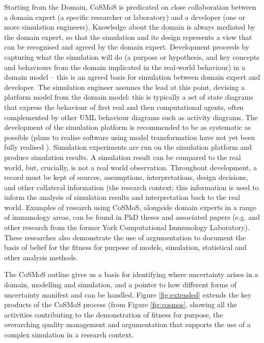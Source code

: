\documentclass[sigconf,authordraft]{acmart}
\begin{document}
Starting from the Domain, CoSMoS is predicated on close collaboration between a domain expert (a specific researcher or laboratory) and a developer (one or more simulation engineers).  Knowledge about the domain is always mediated by the domain expert, so that the simulation and its design represents a view that can be recognised and agreed by the domain expert.  Development proceeds by capturing what the simulation will do (a purpose or hypothesis, and key concepts and behaviours from the domain implicated in the real-world behaviour) in a domain model -- this is an agreed basis for simulation between domain expert and developer.  The simulation engineer assumes the lead at this point, devising a platform model from the domain model: this is typically a set of state diagrams that express the behaviour of first real and then computational agents, often complemented by other UML behaviour diagrams such as activity diagrams.  The development of the simulation platform is recommended to be as systematic as possible (plans to realise software using model transformation have not yet been fully realised \cite{workshop}).  Simulation experiments are run on the simulation platform and produce simulation results.  A simulation result can be compared to the real world, but, crucially, is not a real world observation.  Throughout development, a record must be kept of sources, assumptions, interpretations, design decisions, and other collateral information (the research context; this information is used to inform the analysis of simulation results and interpretation back to the real world.  Examples of research using CoSMoS, alongside domain experts in a range of immunology areas, can be found in PhD theses and associated papers (e.g. \cite{aldenPhD,moyoPhD,readPhD,williamsEAE} and other research from the former York Computational Immunology Laboratory).  These researches also demonstrate the use of argumentation \cite{AldenArg,cosmosBook} to document the basis of belief for the fitness for purpose of models, simulation, statistical and other analysis methods.

The CoSMoS outline gives us a basis for identifying where uncertainty arises in a domain, modelling and simulation, and a pointer to how different forms of uncertainty manifest and can be handled.
Figure \ref{fig:extended} extends the key products of the CoSMoS process (from Figure \ref{fig:cosmos},  showing all the activities contributing to the demonstration of fitness for purpose, the overarching quality management and argumentation that supports the use of a complex simulation in a research context.  
\end{document}
